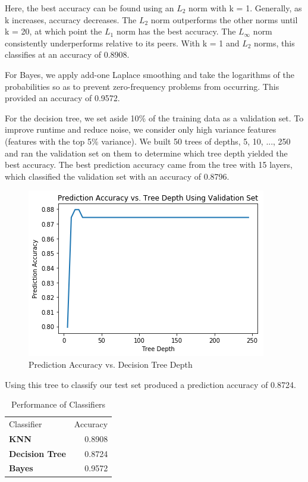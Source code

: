 \documentclass[twoside,11pt]{homework}
\begin{document}
	Here, the best accuracy can be found using an $L_2$ norm with k = 1. Generally, as k increases, accuracy decreases. The $L_2$ norm outperforms the other norms until k = 20, at which point the $L_1$ norm has the best accuracy. The $L_\infty$ norm consistently underperforms relative to its peers. With k = 1 and $L_2$ norms, this classifies at an accuracy of 0.8908.
	
	For Bayes, we apply add-one Laplace smoothing and take the logarithms of the probabilities so as to prevent zero-frequency problems from occurring. This provided an accuracy of 0.9572.
	
	For the decision tree, we set aside 10\% of the training data as a validation set. To improve runtime and reduce noise, we consider only high variance features (features with the top 5\% variance). We built 50 trees of depths, 5, 10, ..., 250 and ran the validation set on them to determine which tree depth yielded the best accuracy. The best prediction accuracy came from the tree with 15 layers, which classified the validation set with an accuracy of 0.8796.
	
	\begin{figure}[H]
		\centering
		\includegraphics[scale=.5]{q6_fig/dt_val.png}	
		\caption{Prediction Accuracy vs. Decision Tree Depth}
	\end{figure}
	
	Using this tree to classify our test set produced a prediction accuracy of 0.8724.
		\begin{table}[H]
	\centering
	\caption{Performance of Classifiers}
	\begin{tabular}{lr}
		Classifier   & Accuracy \\
		\textbf{KNN}   & 0.8908    \\
		\textbf{Decision Tree}   & 0.8724        \\
		\textbf{Bayes} & 0.9572
	\end{tabular}
	\end{table}
	
\end{document}
